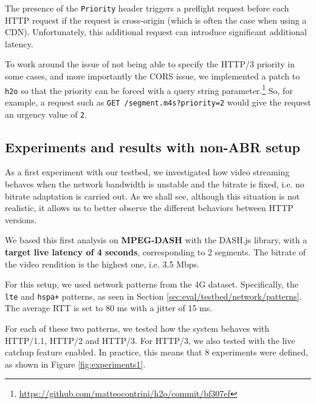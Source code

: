 The presence of the \texttt{Priority} header triggers a preflight request before each HTTP request if the request is cross-origin (which is often the case when using a CDN). Unfortunately, this additional request can introduce significant additional latency.

To work around the issue of not being able to specify the HTTP/3 priority in some cases, and more importantly the CORS issue, we implemented a patch to \texttt{h2o} so that the priority can be forced with a query string parameter.\footnote{\url{https://github.com/matteocontrini/h2o/commit/bf307ef}} So, for example, a request such as \texttt{GET /segment.m4s?priority=2} would give the request an urgency value of \texttt{2}.

\subsection{Experiments and results with non-ABR setup}
\label{sec:eval/non-abr}

As a first experiment with our testbed, we investigated how video streaming behaves when the network bandwidth is unstable and the bitrate is fixed, i.e. no bitrate adaptation is carried out. As we shall see, although this situation is not realistic, it allows us to better observe the different behaviors between HTTP versions.

We based this first analysis on \textbf{MPEG-DASH} with the DASH.js library, with a \textbf{target live latency of 4 seconds}, corresponding to 2 segments. The bitrate of the video rendition is the highest one, i.e. 3.5 Mbps.

For this setup, we used network patterns from the 4G dataset. Specifically, the \texttt{lte} and \texttt{hspa+} patterns, as seen in Section \ref{sec:eval/testbed/network/patterns}. The average RTT is set to 80 ms with a jitter of 15 ms.

For each of these two patterns, we tested how the system behaves with HTTP/1.1, HTTP/2 and HTTP/3. For HTTP/3, we also tested with the live catchup feature enabled. In practice, this means that 8 experiments were defined, as shown in Figure \ref{fig:experiments1}.

